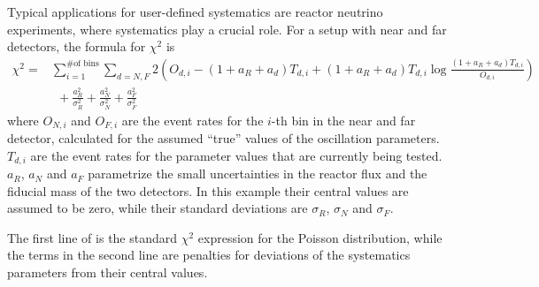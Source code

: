 Typical applications for user-defined systematics are reactor neutrino experiments,
where systematics play a crucial role. For a setup with near and far detectors,
the formula for $\chi^2$ is
\begin{align}
  \chi^2 =& \sum_{i=1}^{\textrm{\# of bins}} \sum_{d = N,F}2
     \left( O_{d,i} - (1 + a_R + a_d) T_{d,i} +
       (1 + a_R + a_d) T_{d,i} \log \frac{(1 + a_R + a_d) T_{d,i}}{O_{d,i}}  \right) \nonumber\\
         & \ \ + \frac{a_R^2}{\sigma_R^2} + \frac{a_N^2}{\sigma_N^2} + \frac{a_F^2}{\sigma_F^2}
\label{equ:chi2reactor}
\end{align}
where $O_{N,i}$ and $O_{F,i}$ are the event rates for the $i$-th bin in the near and
far detector, calculated for the assumed ``true'' values of the oscillation parameters.
$T_{d,i}$ are the event rates for the parameter values that are currently being tested.
$a_R$, $a_N$ and $a_F$ parametrize the small uncertainties in the reactor flux and the fiducial
mass of the two detectors. In this example their central values are assumed to be zero,
while their standard deviations are $\sigma_R$, $\sigma_N$ and $\sigma_F$.

The first line of  is the standard $\chi^2$ expression for
the Poisson distribution, while the terms in the second line are penalties
for deviations of the systematics parameters from their central values.


